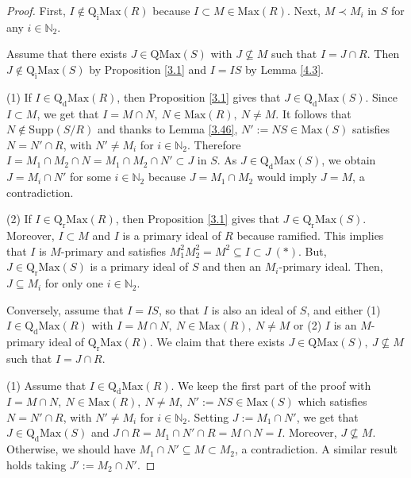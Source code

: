 \documentclass[12pt,leqno]{amsart}
\theoremstyle{definition}
\begin{document}
\begin{proof} First, $I\not\in\mathrm{Q_iMax}(R)$ because $I\subset M\in\mathrm{Max}(R)$. Next, $M\prec M_i$ in $S$ for any $i\in\mathbb N_2$.

Assume that there exists $J\in\mathrm{QMax}(S)$ with $J\not\subseteq M$ such that $I=J\cap R$. Then $J\not\in\mathrm{Q_iMax}(S)$ by Proposition \ref{3.1} and $I=IS$ by Lemma \ref{4.3}.  

(1) If $I\in\mathrm{Q_dMax}(R)$, then Proposition \ref{3.1} gives that $J\in\mathrm{Q_dMax}(S)$. Since $I\subset M$, we get that $I=M\cap N,\ N\in\mathrm{Max}(R),\ N\neq M$. It follows that $N\not\in\mathrm{Supp}(S/R)$ and thanks to Lemma \ref{3.46}, $N':=NS\in\mathrm{Max}(S)$ satisfies $N =N'\cap R$, with $N'\neq M_i$ for $i\in\mathbb N_2$. Therefore $I=M_1 \cap M_2\cap N=M_1\cap M_2\cap N'\subset J$ in $S$. As $J\in\mathrm {Q_dMax}(S)$, we obtain $J=M_i\cap N'$ for some $i\in\mathbb N_2$ because $J=M_1 \cap M _2$ would imply $J=M$, a contradiction.

(2) If $I\in\mathrm{Q_rMax}(R)$, then Proposition \ref{3.1} gives that $J\in\mathrm{Q_rMax}(S)$. Moreover, $I\subset M$ and $I$ is a primary ideal 
 of $R$ because ramified. This implies that $I$ is $M$-primary and satisfies $M_1^2M_2^2=M^2\subseteq I\subset J\ (*)$. But, $J\in\mathrm {Q_rMax}(S)$ is a primary ideal of $S$ and then an $M_i$-primary ideal. Then, $J\subseteq M_i$ for only one $i\in\mathbb N_2$.

Conversely, assume that $I=IS$, so that $I$ is also an ideal of $S$, and
either (1) $I\in\mathrm{Q_dMax}(R)$ with $I=M\cap N,\ N\in\mathrm{Max}(R),\ N\neq M$ or (2) $I$ is an $M$-primary ideal of $\mathrm{Q_rMax}(R)$. We claim that there exists $J\in\mathrm{QMax}(S),\ J\not\subseteq M$
 such that $I=J\cap R$.
 
(1) Assume that $I\in\mathrm{Q_dMax}(R)$. We keep the first part of the proof with $I=M\cap N,\ N\in\mathrm{Max}(R),\ N\neq M,\ N':=NS\in\mathrm{Max}(S)$ which satisfies $N=N'\cap R$, with $N'\neq M_i$ for $i\in\mathbb N_2$. Setting $J:=M_1\cap N'$, we get that $J\in\mathrm{Q_d Max}(S)$ and $J\cap R=M_1\cap N'\cap R=M\cap N=I$. Moreover, $J\not\subseteq M$. Otherwise, we should have $M_1\cap N'\subseteq M\subset M_2$, a contradiction. A similar result holds taking $J':=M_2\cap N'$.


\end{proof}
\end{document}

